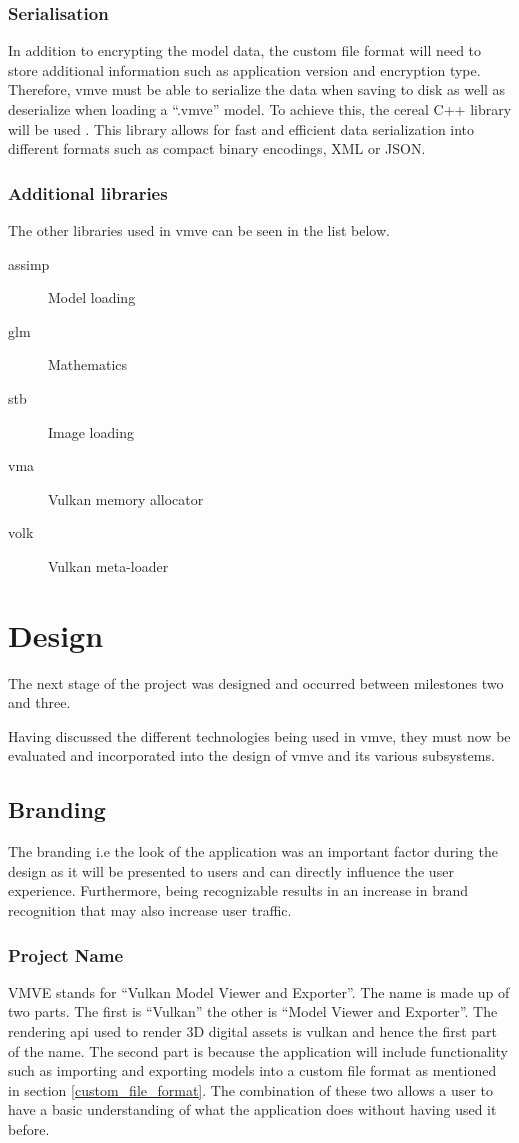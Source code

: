 \documentclass[11pt]{article}
\begin{document}
\subsubsection{Serialisation}
In addition to encrypting the model data, the custom file format will need to
store additional information such as application version and encryption type.
Therefore, \gls*{vmve} must be able to serialize the data when saving to disk as
well as deserialize when loading a ``.vmve'' model. To achieve this, the cereal
C++ library will be used \cite{cereal}. This library allows for fast and
efficient data serialization into different formats such as compact binary
encodings, XML or JSON.

\subsubsection{Additional libraries}
The other libraries used in \gls*{vmve} can be seen in the list below.
\begin{description}
  \item[assimp] Model loading
  \item[glm] Mathematics
  \item[stb] Image loading
  \item[vma] Vulkan memory allocator
  \item[volk] Vulkan meta-loader
\end{description}

\clearpage
\section{Design}
The next stage of the project was designed and occurred between milestones two
and three. 

Having discussed the different technologies being used in \gls*{vmve}, they must
now be evaluated and incorporated into the design of \gls*{vmve} and its various
subsystems.

\subsection{Branding}
The branding i.e the look of the application was an important factor during the
design as it will be presented to users and can directly influence the user
experience. Furthermore, being recognizable results in an increase in brand
recognition that may also increase user traffic.

\subsubsection{Project Name}
VMVE stands for ``Vulkan Model Viewer and Exporter''. The name is made up of
two parts. The first is ``Vulkan'' the other is ``Model Viewer and Exporter''.
The rendering \gls*{api} used to render 3D digital assets is \gls*{vulkan} and
hence the first part of the name. The second part is because the application
will include functionality such as importing and exporting models into a custom
file format as mentioned in section \ref{custom_file_format}. The combination of
these two allows a user to have a basic understanding of what the application
does without having used it before.
\end{document}
